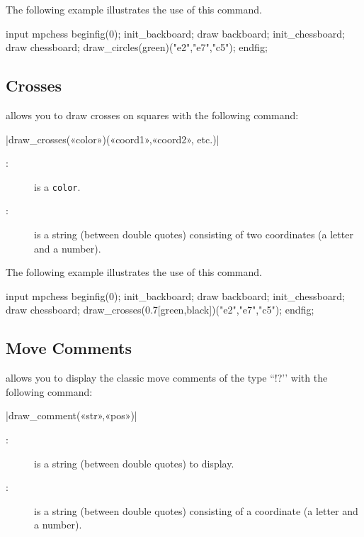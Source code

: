 \documentclass[english]{ltxdoc}
\begin{document}
The following example illustrates the use of this command.

\begin{ExempleMP}
input mpchess
beginfig(0);
init_backboard;
draw backboard;
init_chessboard;
draw chessboard;
draw_circles(green)("e2","e7","c5");
endfig;
\end{ExempleMP}



\subsection{Crosses}


\mpchess allows you to draw crosses on squares with the following command:

\commande|draw_crosses(«color»)(«coord1»,«coord2», etc.)|\smallskip

\begin{description}
\item[:] is a \MP{} \lstinline+color+.
\item[:] is a string (between double quotes) consisting of two
coordinates (a letter and a number). 
\end{description}

The following example illustrates the use of this command.

  
\begin{ExempleMP}
input mpchess
beginfig(0);
init_backboard;
draw backboard;
init_chessboard;
draw chessboard;
draw_crosses(0.7[green,black])("e2","e7","c5");
endfig;
\end{ExempleMP}

\subsection{Move Comments}

\mpchess allows you to display the classic move comments of the type
``!?’’ with the following command:

\commande|draw_comment(«str»,«pos»)|\smallskip

\begin{description}
\item[:] is a string (between double quotes) to display.
\item[:] is a string (between double quotes) consisting
of a coordinate (a letter and a number).
\end{description}
\end{document}
